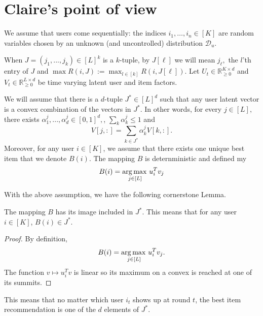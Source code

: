 \newcommand\clairesworries[1]{\textcolor{blue}{#1}}

\section{Claire's point of view}


We assume that users come sequentially: the indices $i_1, \dots, i_n \in [K]$ are \iid random variables chosen by an unknown (and uncontrolled) distribution $\mathcal{D}_u$.


When $J =(j_1,...,j_k) \in [L]^k$ is a $k$-tuple, by $J[\ell]$ we will mean $j_\ell,$ the $l$'th entry of $J$ and
$\max R(i, J) := \max_{l \in [k]} R(i,J[\ell])$.
Let $U_t \in \mathbb{R}_{\geq 0}^{K \times d}$ and $V_t \in \mathbb{R}_{\geq 0}^{L \times d}$  be time varying latent user and item factors.

 \begin{assumption}
 We will assume that there is a $d$-tuple $J^{*} \in [L]^d$ such that any user latent vector is
 a convex combination of the vectors in $J^{*}$.
 In other words, for every  $j \in [L],$ there exists $\alpha_1^j,...,\alpha_d^j \in [0,1]^d,$,
 $ \sum_k \alpha_k^j \leq 1$ and
 \[
  V[j,:] = \sum_{k \in J^*} \alpha_k^j V[k,:].
 \]
 Moreover, for any user $i\in [K]$, we assume that there exists one unique best item
 that we denote $B(i)$. The mapping $B$ is deternministic and defined my
 \[
 B(i) = \operatorname*{arg\,max\,}_{j\in [L]} u_i^T v_j
 \]
 \end{assumption}

With the above assumption, we have the following cornerstone Lemma.

\begin{lemma}
\label{thm:hott}
The mapping $B$ has its image included in $J^*$. This means that for any user $i\in [K]$,
$B(i) \in J^*$.
\end{lemma}
\begin{proof}
By definition,
\[
B(i) = \operatorname*{arg\,max\,}_{j\in [L]} u_i^T v_j.
\]
The function $v \mapsto u_i^T v$ is linear so its maximum on a convex is reached
at one of its summits.

\end{proof}

This means that no matter which user $i_t$ shows up at round $t$, the best item recommendation
is one of the $d$ elements of $J^*$.



